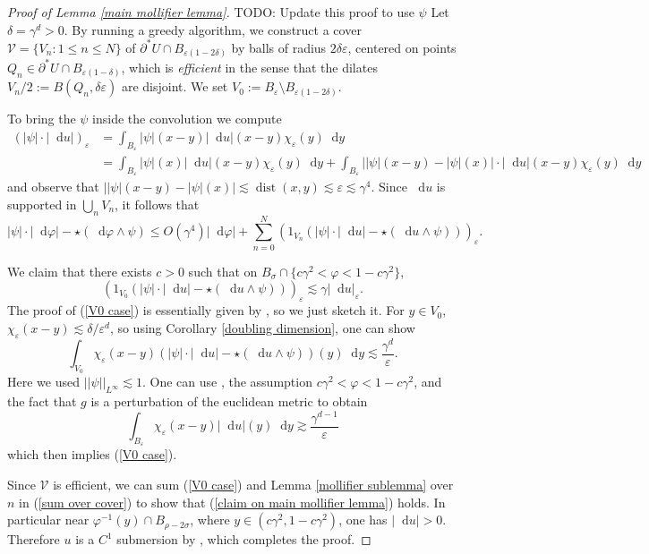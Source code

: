 \documentclass[reqno,11pt]{amsart}
\newcommand*\dif{\mathop{}\!\mathrm{d}}
\DeclareMathOperator{\dist}{dist}
\newcommand{\dfn}[1]{\emph{#1}\index{#1}}
\theoremstyle{definition}
\numberwithin{equation}{section}
\begin{document}
\begin{proof}[Proof of Lemma \ref{main mollifier lemma}]
TODO: Update this proof to use $\psi$
Let $\delta = \gamma^d > 0$.
By running a greedy algorithm, we construct a cover $\mathcal V = \{V_n: 1 \leq n \leq N\}$ of $\partial^* U \cap B_{\varepsilon(1 - 2\delta)}$ by balls of radius $2\delta\varepsilon$, centered on points $Q_n \in \partial^* U \cap B_{\varepsilon(1 - \delta)}$, which is \dfn{efficient} in the sense that the dilates $V_n/2 := B(Q_n, \delta\varepsilon)$ are disjoint.
We set $V_0 := B_\varepsilon \setminus B_{\varepsilon(1 - 2\delta)}$.

To bring the $\psi$ inside the convolution we compute
\begin{align*}
(|\psi| \cdot |\dif u|)_\varepsilon
&= \int_{B_\varepsilon} |\psi|(x - y) |\dif u|(x - y) \chi_\varepsilon(y) \dif y \\
&= \int_{B_\varepsilon} |\psi|(x) |\dif u|(x - y) \chi_\varepsilon(y) \dif y + \int_{B_\varepsilon} ||\psi|(x - y) - |\psi|(x)| \cdot |\dif u|(x - y) \chi_\varepsilon(y) \dif y
\end{align*}
and observe that $||\psi|(x - y) - |\psi|(x)| \lesssim \dist(x, y) \lesssim \varepsilon \lesssim \gamma^4$.
Since $\dif u$ is supported in $\bigcup_n V_n$, it follows that
\begin{equation}\label{sum over cover}
|\psi| \cdot |\dif \varphi| - \star(\dif \varphi \wedge \psi)
\leq O(\gamma^4) |\dif \varphi| + \sum_{n=0}^N (1_{V_n}(|\psi| \cdot |\dif u| - \star(\dif u \wedge \psi)))_\varepsilon.
\end{equation}

We claim that there exists $c > 0$ such that on $B_\sigma \cap \{c\gamma^2 < \varphi < 1 - c\gamma^2\}$,
\begin{equation}\label{V0 case}
(1_{V_0}(|\psi| \cdot |\dif u| - \star(\dif u \wedge \psi)))_\varepsilon \lesssim \gamma |\dif u|_\varepsilon.
\end{equation}
The proof of (\ref{V0 case}) is essentially given by \cite[pg92]{Giusti77}, so we just sketch it.
For $y \in V_0$, $\chi_\varepsilon(x - y) \lesssim \delta/\varepsilon^d$, so using Corollary \ref{doubling dimension}, one can show
$$\int_{V_0} \chi_\varepsilon(x - y)(|\psi| \cdot |\dif u| - \star(\dif u \wedge \psi))(y) \dif y \lesssim \frac{\gamma^d}{\varepsilon}.$$
Here we used $||\psi||_{L^\infty} \lesssim 1$.
One can use \cite[Lemma 7.1]{Giusti77}, the assumption $c\gamma^2 < \varphi < 1 - c\gamma^2$, and the fact that $g$ is a perturbation of the euclidean metric to obtain
$$\int_{B_\varepsilon} \chi_\varepsilon(x - y) |\dif u|(y) \dif y \gtrsim \frac{\gamma^{d - 1}}{\varepsilon}$$
which then implies (\ref{V0 case}).

Since $\mathcal V$ is efficient, we can sum (\ref{V0 case}) and Lemma \ref{mollifier sublemma} over $n$ in (\ref{sum over cover}) to show that (\ref{claim on main mollifier lemma}) holds.
In particular near $\varphi^{-1}(y) \cap B_{\rho - 2\sigma}$, where $y \in (c\gamma^2, 1 - c\gamma^2)$, one has $|\dif u| > 0$.
Therefore $u$ is a $C^1$ submersion by \cite[Lemma 7.1]{Giusti77}, which completes the proof.
\end{proof}
\end{document}
